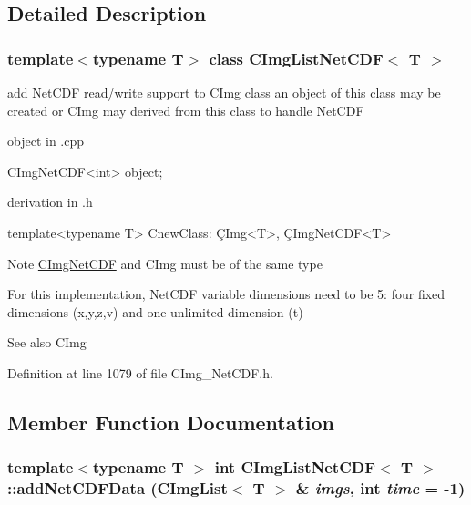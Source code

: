 \subsection{Detailed Description}
\subsubsection*{template$<$typename T$>$ class CImgListNetCDF$<$ T $>$}

add NetCDF read/write support to CImg class an object of this class may be created or CImg may derived from this class to handle NetCDF \begin{DoxyItemize}
\item object in {\ttfamily }.cpp 
\begin{DoxyCode}
   CImgNetCDF<int> object;
\end{DoxyCode}
 \item derivation in {\ttfamily }.h 
\begin{DoxyCode}
   template<typename T> CnewClass: \c CImg<T>, \c CImgNetCDF<T>
\end{DoxyCode}
\end{DoxyItemize}
\begin{DoxyNote}{Note}
{\ttfamily \hyperlink{classCImgNetCDF}{CImgNetCDF}} and {\ttfamily CImg} must be of the same type 

For this implementation, NetCDF variable dimensions need to be 5: four fixed dimensions (x,y,z,v) and one unlimited dimension (t)
\end{DoxyNote}

\begin{DoxyCode}
\end{DoxyCode}


\begin{DoxySeeAlso}{See also}
CImg 
\end{DoxySeeAlso}


Definition at line 1079 of file CImg\_\-NetCDF.h.

\subsection{Member Function Documentation}
\hypertarget{classCImgListNetCDF_a696a8197593274e23af28420c473036e}{
\subsubsection[{addNetCDFData}]{\setlength{\rightskip}{0pt plus 5cm}template$<$typename T $>$ int {\bf CImgListNetCDF}$<$ T $>$::addNetCDFData (CImgList$<$ T $>$ \& {\em imgs}, \/  int {\em time} = {\ttfamily -\/1})}}
\label{classCImgListNetCDF_a696a8197593274e23af28420c473036e}


